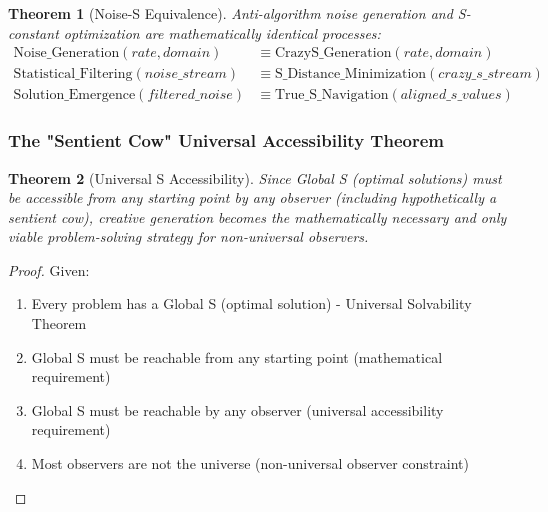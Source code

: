 \documentclass[12pt,a4paper]{article}
\newtheorem{theorem}{Theorem}[section]
\begin{document}
{{{{{{{{{{{{{{\begin{theorem}[Noise-S Equivalence]
Anti-algorithm noise generation and S-constant optimization are mathematically identical processes:
\begin{align}
\text{Noise\_Generation}(rate, domain) &\equiv \text{CrazyS\_Generation}(rate, domain) \\
\text{Statistical\_Filtering}(noise\_stream) &\equiv \text{S\_Distance\_Minimization}(crazy\_s\_stream) \\
\text{Solution\_Emergence}(filtered\_noise) &\equiv \text{True\_S\_Navigation}(aligned\_s\_values)
\end{align}
\end{theorem}

\subsubsection{The "Sentient Cow" Universal Accessibility Theorem}

\begin{theorem}[Universal S Accessibility]
Since Global S (optimal solutions) must be accessible from any starting point by any observer (including hypothetically a sentient cow), creative generation becomes the mathematically necessary and only viable problem-solving strategy for non-universal observers.
\end{theorem}

\begin{proof}
Given:
\begin{enumerate}
\item Every problem has a Global S (optimal solution) - Universal Solvability Theorem
\item Global S must be reachable from any starting point (mathematical requirement)
\item Global S must be reachable by any observer (universal accessibility requirement)
\item Most observers are not the universe (non-universal observer constraint)
\end{enumerate}


\end{proof}}}}}}}}}}}}}}}
\end{document}
